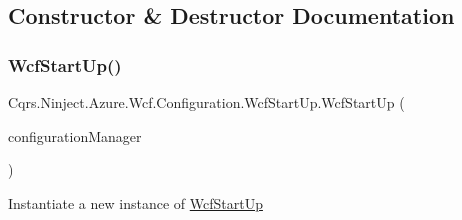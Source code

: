 \subsection{Constructor \& Destructor Documentation}
\mbox{\label{classCqrs_1_1Ninject_1_1Azure_1_1Wcf_1_1Configuration_1_1WcfStartUp_a43968a1c4f997d56c2b6eb0a3b6e46a3_a43968a1c4f997d56c2b6eb0a3b6e46a3}} 
\subsubsection{\texorpdfstring{Wcf\+Start\+Up()}{WcfStartUp()}}
{\footnotesize\ttfamily Cqrs.\+Ninject.\+Azure.\+Wcf.\+Configuration.\+Wcf\+Start\+Up.\+Wcf\+Start\+Up (\begin{DoxyParamCaption}\item[{\hyperlink{interfaceCqrs_1_1Configuration_1_1IConfigurationManager}{I\+Configuration\+Manager}}]{configuration\+Manager }\end{DoxyParamCaption})}



Instantiate a new instance of \hyperlink{classCqrs_1_1Ninject_1_1Azure_1_1Wcf_1_1Configuration_1_1WcfStartUp}{Wcf\+Start\+Up} 

